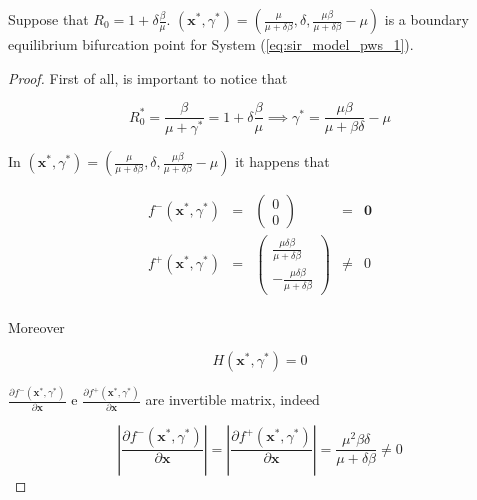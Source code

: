 \begin{theorem} Suppose that $R_0 = 1+\delta\frac{\beta}{\mu}$. $(\textbf{x}^*,\gamma^*) = \left(\frac{\mu}{\mu+\delta\beta},\delta,\frac{\mu\beta}{\mu+\delta\beta}-\mu\right)$ is a boundary equilibrium bifurcation point for System (\ref{eq:sir_model_pws_1}).
\end{theorem}

\begin{proof}
First of all, is important to notice that
 
\begin{equation}
    R_0^* = \frac{\beta}{\mu+\gamma^*} = 1+\delta\frac{\beta}{\mu} \implies \gamma^* = \frac{\mu\beta}{\mu+\beta\delta} - \mu
\end{equation}

In $(\textbf{x}^*,\gamma^*) = \left(\frac{\mu}{\mu+\delta\beta},\delta,\frac{\mu\beta}{\mu+\delta\beta}-\mu\right)$ it happens that 

\begin{equation}
\label{eq:bifurcation_point_cond_1}
    \begin{array}{ccccc}
        f^-(\textbf{x}^*,\gamma^*) &=& \begin{pmatrix} 0 \\ 0 \end{pmatrix} & = & \textbf{0} \\
        f^+(\textbf{x}^*,\gamma^*) &=& \begin{pmatrix} \frac{\mu\delta\beta}{\mu+\delta\beta} \\ -\frac{\mu\delta\beta}{\mu+\delta\beta} \end{pmatrix} & \neq & 0 \\
    \end{array}
\end{equation}

Moreover

\begin{equation}
\label{eq:bifurcation_point_cond_2}
    H(\textbf{x}^*,\gamma^*) = 0
\end{equation}

$\frac{\partial f^-(\textbf{x}^*,\gamma^*)}{\partial \textbf{x}}$ e $\frac{\partial f^+(\textbf{x}^*,\gamma^*)}{\partial \textbf{x}}$ are invertible matrix, indeed

\begin{equation}
\label{eq:bifurcation_point_cond_3}
    \left| \frac{\partial f^-(\textbf{x}^*,\gamma^*)}{\partial \textbf{x}} \right| = \left| \frac{\partial f^+(\textbf{x}^*,\gamma^*)}{\partial \textbf{x}} \right| =  \frac{\mu^2\beta\delta}{\mu+\delta\beta} \neq 0
\end{equation}


\end{proof}

